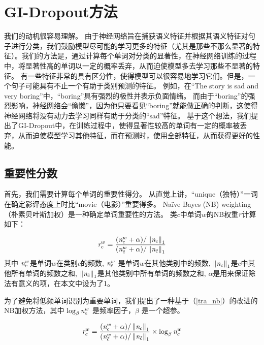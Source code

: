 \section{GI-Dropout方法}
我们的动机很容易理解。
由于神经网络旨在捕获语义特征并根据其语义特征对句子进行分类，我们鼓励模型尽可能的学习更多的特征（尤其是那些不那么显著的特征）。我们的方法是，通过计算每个单词对分类的显著性，在神经网络训练的过程中，将显著性高的单词以一定的概率丢弃，从而迫使模型多去学习那些不显著的特征。
有一些特征非常的具有区分性，使得模型可以很容易地学习它们。但是，一个句子可能具有不止一个有助于类别预测的特征。
例如，在``The story is sad and very boring''中，``boring''具有强烈的极性并表示负面情绪。
而由于``boring''的强烈影响，神经网络会``偷懒''，因为他只要看见``boring''就能做正确的判断，这使得神经网络将没有动力去学习同样有助于分类的``sad''特征。
基于这个想法，我们提出了GI-Dropout中，在训练过程中，使得显著性较高的单词有一定的概率被丢弃，从而迫使模型学习其他特征，而在预测时，使用全部特征，从而获得更好的性能。


\subsection{重要性分数}
\label{Importance Score}
首先，我们需要计算每个单词的重要性得分。
从直觉上讲，``unique（独特）''一词在确定影评态度上时比``movie（电影）''重要得多。
Na\"ive Bayes (NB) weighting（朴素贝叶斯加权）是一种确定单词重要性的方法\cite{martineau2009delta,wang2012baselines,li2017initializing}。
类$c$中单词$w$的NB权重$\emph{r}$计算如下：

\begin{equation}\label{tra_nb}
 \emph{r}_{c}^{w} = \frac{(\emph{n}_{c}^{w} + \alpha ) /\left \| \emph{n}_{c} \right \|_{1}} {(\emph{n}_{\tilde{c}}^{w} + \alpha )/\left \| \emph{n}_{\tilde{c}} \right \|_{1}}
\end{equation}
其中 $\emph{n}_{c}^{w}$是单词$w$在类别$c$的频数,
$\emph{n}_{\tilde{c}}^{w}$ 是单词$w$在其他类别中的频数,
$\left \| \emph{n}_{c} \right \|_{1}$是$c$中其他所有单词的频数之和,
$\left \| \emph{n}_{\tilde{c}} \right \|_{1}$是其他类别中所有单词的频数之和,
$\alpha$是用来保证除法有意义的项，在本文中设为了1。 

为了避免将低频单词识别为重要单词，我们提出了一种基于（\ref{tra_nb}）的改进的NB加权方法，其中 $\log_{\beta}\emph{n}_{c}^{w}$ 是频率因子，$\beta$ 是一个超参。


\begin{equation}\label{new_nb}
  \emph{r}_{c}^{w} = \frac{(\emph{n}_{c}^{w} + \alpha ) /\left \| \emph{n}_{c} \right \|_{1}} {(\emph{n}_{\tilde{c}}^{w} + \alpha )/\left \| \emph{n}_{\tilde{c}} \right \|_{1}} \times \log_{\beta}\emph{n}_{c}^{w}
\end{equation}


